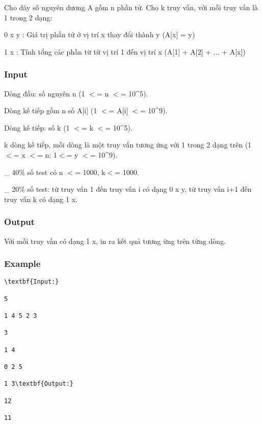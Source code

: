 

Cho dãy số nguyên dương A gồm n phần tử. Cho k truy vấn, với mỗi truy vấn là 1 trong 2 dạng:

0 x y : Giá trị phần tử ở vị trí x thay đổi thành y (A[x] = y)

1 x : Tính tổng các phần từ từ vị trí 1 đến vị trí x (A[1] + A[2] + ... + A[x])

\subsubsection{Input}

Dòng đầu: số nguyên n (1 $<$= n $<$= 10\textasciicircum5).

Dòng kế tiếp gồm n số A[i] (1 $<$= A[i] $<$= 10\textasciicircum9).

Dòng kế tiếp: số k (1 $<$= k $<$= 10\textasciicircum5).

k dòng kế tiếp, mỗi dòng là một truy vấn tương ứng với 1 trong 2 dạng trên (1 $<$= x $<$= n; 1$<$= y $<$= 10\textasciicircum9).

\_ 40\% số test có n $<$= 1000, k$<$= 1000.

\_ 20\% số test: từ truy vấn 1 đến truy vấn i có dạng 0 x y, từ truy vấn i+1 đến truy vấn k có dạng 1 x.

\subsubsection{Output}

Với mỗi truy vấn có dạng 1 x, in ra kết quả tương ứng trên từng dòng.

\subsubsection{Example}
\begin{verbatim}
\textbf{Input:}

5

1 4 5 2 3

3

1 4

0 2 5

1 3\textbf{Output:}

12

11\end{verbatim}